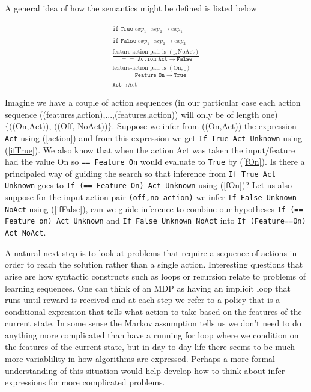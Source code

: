 \documentclass[a4paper,12pt]{article}
\begin{document}
A general idea of how the semantics might be defined is listed below

\begin{eqnarray}
&\frac{}{\texttt{if True } exp_1\texttt{ } exp_2 \rightarrow exp_1}\label{ifTrue}&\\
&\frac{}{\texttt{if False } exp_1\texttt{ } exp_2 \rightarrow exp_2} \label{ifFalse}&\\
&\frac{\text{feature-action pair is } (\_,\text{NoAct})}{== \texttt{ Action } \texttt{Act} \rightarrow \texttt{False}} &\\
&\frac{\text{feature-action pair is } (\text{On},\_)}{== \texttt{ Feature } \texttt{On} \rightarrow \texttt{True}} \label{fOn} &\\
&\frac{}{\texttt{Act} \rightarrow \text{Act}} \label{action}&
\end{eqnarray}

Imagine we have a couple of action sequences (in our particular case each action sequence ((features,action),...,(features,action))  will only be of length one) $\{\text{((On,Act)), ((Off, NoAct))}\}$.  Suppose we infer from ((On,Act)) the expression \texttt{Act} using (\ref{action}) and from this expression we get \texttt{If True Act Unknown} using (\ref{ifTrue}).  We also know that when the action Act was taken the input/feature had the value On so \texttt{== Feature On} would evaluate to \texttt{True} by (\ref{fOn}).  Is there a principaled way of guiding the search so that inference from \texttt{If True Act Unknown} goes to \texttt{If (== Feature On) Act Unknown} using (\ref{fOn})?  Let us also suppose for the input-action pair \texttt{(off,no action)} we infer \texttt{If False Unknown NoAct} using (\ref{ifFalse}), can we guide inference to combine our hypotheses \texttt{If (== Feature on) Act Unknown} and \texttt{If False Unknown NoAct} into \texttt{If (Feature==On) Act NoAct}.

A natural next step is to look at problems that require a sequence of actions in order to reach the solution rather than a single action.  Interesting questions that arise are how syntactic constructs such as loops or recursion relate to problems of learning sequences.  One can think of an MDP as having an implicit loop that runs until reward is received and at each step we refer to a policy that is a conditional expression that tells what action to take based on the features of the current state.  In some sense the Markov assumption tells us we don't need to do anything more complicated than have a running for loop where we condition on the features of the current state, but in day-to-day life there seems to be much more variablility in how algorithms are expressed.  Perhaps a more formal understanding of this situation would help develop how to think about infer expressions for more complicated problems.


\end{document}
